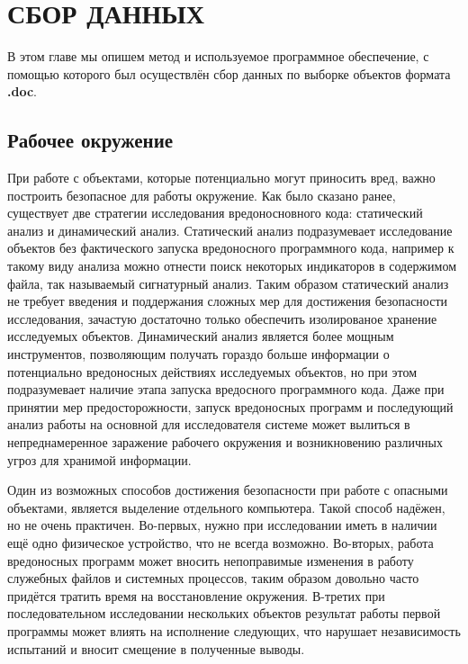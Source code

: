 \chapter{СБОР ДАННЫХ}

В этом главе мы опишем метод и используемое программное обеспечение, с помощью которого был осуществлён сбор данных по выборке объектов формата \textbf{.doc}.

\section{Рабочее окружение}

При работе с объектами, которые потенциально могут приносить вред, важно построить безопасное для работы окружение.
Как было сказано ранее, существует две стратегии исследования вредоносновного кода: статический анализ и динамический анализ.
Статический анализ подразумевает исследование объектов без фактического запуска вредоносного программного кода, например к такому виду анализа можно отнести поиск некоторых индикаторов в содержимом файла, так называемый сигнатурный анализ.
Таким образом статический анализ не требует введения и поддержания сложных мер для достижения безопасности исследования, зачастую достаточно только обеспечить изолированое хранение исследуемых объектов.
Динамический анализ является более мощным инструментов, позволяющим получать гораздо больше информации о потенциально вредоносных действиях исследуемых объектов, но при этом подразумевает наличие этапа запуска вредосного программного кода.
Даже при принятии мер предосторожности, запуск вредоносных программ и последующий анализ работы на основной для исследователя системе может вылиться в непреднамеренное заражение рабочего окружения и возникновению различных угроз для хранимой информации.

Один из возможных способов достижения безопасности при работе с опасными объектами, является выделение отдельного компьютера.
Такой способ надёжен, но не очень практичен. Во-первых, нужно при исследовании иметь в наличии ещё одно физическое устройство, что не всегда возможно.
Во-вторых, работа вредоносных программ может вносить непоправимые изменения в работу служебных файлов и системных процессов, таким образом довольно часто придётся тратить время на восстановление окружения.
В-третих при последовательном исследовании нескольких объектов результат работы первой программы может влиять на исполнение следующих, что нарушает независимость испытаний и вносит смещение в полученные выводы.

